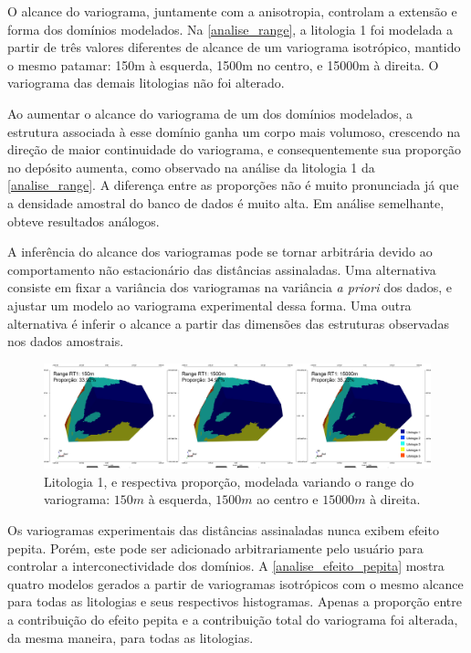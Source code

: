 O alcance do variograma, juntamente com a anisotropia, controlam a extensão e forma dos domínios modelados. Na \autoref{analise_range}, a litologia 1 foi modelada a partir de três valores diferentes de alcance de um variograma isotrópico, mantido o mesmo patamar: 150m à esquerda, 1500m no centro, e 15000m à direita. O variograma das demais litologias não foi alterado.

Ao aumentar o alcance do variograma de um dos domínios modelados, a estrutura associada à esse domínio ganha um corpo mais volumoso, crescendo na direção de maior continuidade do variograma, e consequentemente sua proporção no depósito aumenta, como observado na análise da litologia 1 da \autoref{analise_range}. A diferença entre as proporções não é muito pronunciada já que a densidade amostral do banco de dados é muito alta. Em análise semelhante,  obteve resultados análogos.  

A inferência do alcance dos variogramas pode se tornar arbitrária devido ao comportamento não estacionário das distâncias assinaladas. Uma alternativa consiste em fixar a variância dos variogramas na variância \textit{a priori} dos dados, e ajustar um modelo ao variograma experimental dessa forma. Uma outra alternativa é inferir o alcance a partir das dimensões das estruturas observadas nos dados amostrais.

\begin{figure}[H]
	\caption{\label{analise_range}Litologia 1, e respectiva proporção, modelada variando o range do variograma: $150m$ à esquerda, $1500m$ ao centro e $15000m$ à direita.}
	\begin{center}
		\includegraphics[width=\textwidth]{estudo_de_caso/analise_range}
	\end{center}
\end{figure}

Os variogramas experimentais das distâncias assinaladas nunca exibem efeito pepita. Porém, este pode ser adicionado arbitrariamente pelo usuário para controlar a interconectividade dos domínios. A \autoref{analise_efeito_pepita} mostra quatro modelos gerados a partir de variogramas isotrópicos com o mesmo alcance para todas as litologias e seus respectivos histogramas. Apenas a proporção entre a contribuição do efeito pepita e a contribuição total do variograma foi alterada, da mesma maneira, para todas as litologias.

